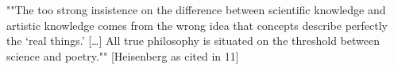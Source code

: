 %
""The too strong insistence on the difference between scientific knowledge and artistic knowledge comes from the wrong idea that concepts describe perfectly the ‘real things.’ […] All true philosophy is situated on the threshold between science and poetry."" [Heisenberg as cited in 11]
%
%
%
%
%
%
%
